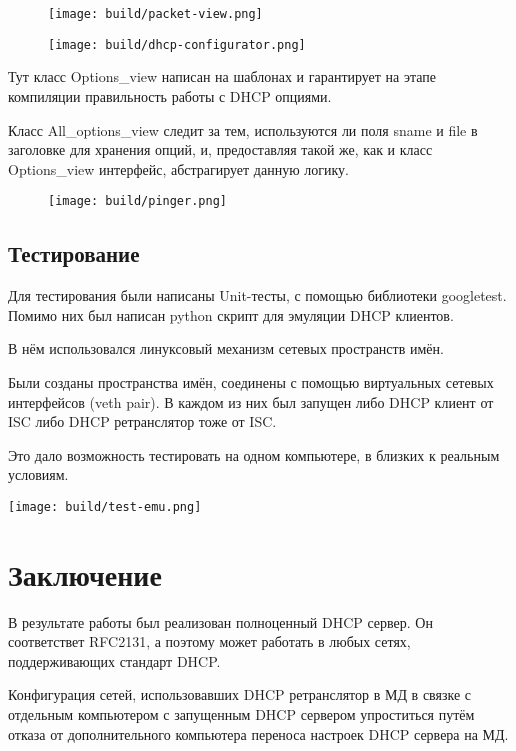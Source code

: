 \documentclass[12pt]{article}
\begin{document}
\begin{figure}[H]
    \texttt{[image: build/packet-view.png]}
    \caption{}
\end{figure}


\begin{figure}[H]
    \texttt{[image: build/dhcp-configurator.png]}
    \caption{}
\end{figure}

Тут класс Options\_view написан на шаблонах и гарантирует на этапе компиляции правильность работы с DHCP опциями.

Класс All\_options\_view следит за тем, используются ли поля sname и file в заголовке для хранения опций, и, предоставляя такой же, как и класс Options\_view интерфейс, абстрагирует данную логику.

\begin{figure}[H]
    \texttt{[image: build/pinger.png]}
    \caption{}
\end{figure}

\pagebreak
\subsection{Тестирование}

Для тестирования были написаны Unit-тесты, с помощью библиотеки googletest.
Помимо них был написан python скрипт для эмуляции DHCP клиентов.

В нём использовался линуксовый механизм сетевых пространств имён.

Были созданы пространства имён, соединены с помощью виртуальных сетевых интерфейсов (veth pair). В каждом из них был запущен либо DHCP клиент от ISC либо DHCP ретранслятор тоже от ISC.

Это дало возможность тестировать на одном компьютере, в близких к реальным условиям.

\texttt{[image: build/test-emu.png]}

\pagebreak
\section{Заключение}

В результате работы был реализован полноценный DHCP сервер.
Он соответствет RFC2131, а поэтому может работать в любых сетях, поддерживающих стандарт DHCP.

Конфигурация сетей, использовавших DHCP ретранслятор в МД в связке с отдельным компьютером с запущенным DHCP сервером упроститься путём отказа от дополнительного компьютера переноса настроек DHCP сервера на МД.
\end{document}
